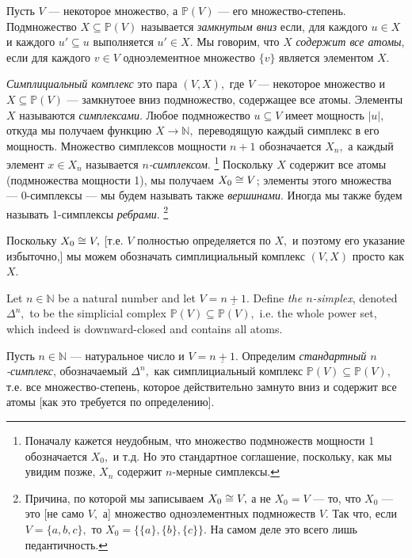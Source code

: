\documentclass[../main/CT4S-EN-RU]{subfiles}
\begin{document}
\begin{definitionRUS}\label{def:simplicial complex}
Пусть $V$ — некоторое множество, а ${ℙ}(V)$ — его множество-степень. Подмножество $X\subseteq{ℙ}(V)$ называется {\em замкнутым вниз} если, для каждого $u\in X$ и каждого $u'\subseteq u$ выполняется $u'\in X.$ Мы говорим, что $X$ {\em содержит все атомы}, если для каждого $v\in V$ одноэлементное множество $\{v\}$ является элементом $X.$ 

{\em Симплициальный комплекс} это пара $(V,X),$ где $V$ — некоторое множество и $X\subseteq{ℙ}(V)$ — замкнутоее вниз подмножество, содержащее все атомы. Элементы $X$ называются {\em симплексами}. Любое подмножество $u\subseteq V$ имеет мощность $|u|,$ откуда мы получаем функцию $X{→}{ℕ},$ переводящую каждый симплекс в его мощность. Множество симплексов мощности $n+1$ обозначается $X_n,$ а каждый элемент $x\in X_n$ называется {\em $n$-симплексом}.%
\footnote{Поначалу кажется неудобным, что множество подмножеств мощности 1 обозначается $X_0,$ и т.д. Но это стандартное соглашение, поскольку, как мы увидим позже, $X_n$ содержит $n$-мерные симплексы.}
Поскольку $X$ содержит все атомы (подмножества мощности 1), мы получаем $X_0\cong V$; элементы этого множества — 0-симплексы — мы будем называть также {\em вершинами}. Иногда мы также будем называть 1-симплексы {\em ребрами}.%
\footnote{Причина, по которой мы записываем $X_0\cong V,$ а не $X_0=V$ — то, что $X_0$ — это [не само $V,$ а] множество одноэлементных подмножеств $V.$ Так что, если $V=\{a,b,c\},$ то $X_0=\{\{a\},\{b\},\{c\}\}.$ На самом деле это всего лишь педантичность.}

Поскольку $X_0\cong V,$ [т.е. $V$ полностью определяется по $X,$ и поэтому его указание избыточно,] мы можем обозначать симплициальный комплекс $(V,X)$ просто как $X.$
\end{definitionRUS}

\begin{exampleENG}
Let $n\in{ℕ}$ be a natural number and let $V=\underline{n+1}.$ Define {\em the $n$-simplex}, denoted ${Δ}^n,$ to be the simplicial complex ${ℙ}(V)\subseteq{ℙ}(V),$ i.e. the whole power set, which indeed is downward-closed and contains all atoms. 
\end{exampleENG}

\begin{exampleRUS}
Пусть $n\in{ℕ}$ — натуральное число и $V=\underline{n+1}.$ Определим {\em стандартный $n$-симплекс},%
обозначаемый ${Δ}^n,$ как симплициальный комплекс ${ℙ}(V)\subseteq{ℙ}(V),$ т.е. все множество-степень, которое действительно замнуто вниз и содержит все атомы [как это требуется по определению]. 
\end{exampleRUS}
\end{document}
